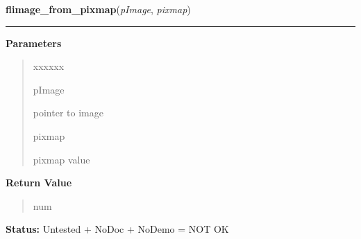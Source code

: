 \hspace{.8\funcindent}\begin{boxedminipage}{\funcwidth}

    \raggedright \textbf{flimage\_from\_pixmap}(\textit{pImage}, \textit{pixmap})

    \vspace{-1.5ex}

    \rule{\textwidth}{0.5\fboxrule}
\setlength{\parskip}{2ex}
\setlength{\parskip}{1ex}
      \textbf{Parameters}
      \vspace{-1ex}

      \begin{quote}
        \begin{Ventry}{xxxxxx}

          \item[pImage]

          pointer to image

          \item[pixmap]

          pixmap value

        \end{Ventry}

      \end{quote}

      \textbf{Return Value}
    \vspace{-1ex}

      \begin{quote}
      num

      \end{quote}

\textbf{Status:} Untested + NoDoc + NoDemo = NOT OK



    \end{boxedminipage}

    \label{xformslib:library:flimage_to_pixmap}

    \vspace{0.5ex}

